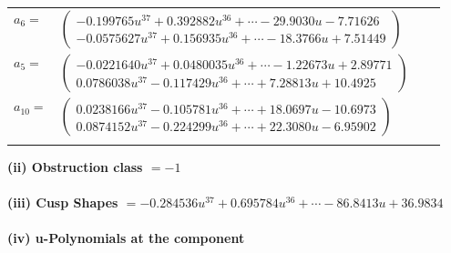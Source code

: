 \documentclass[1p]{elsarticle_modified}
\theoremstyle{definition}
\begin{document}
\begin{tabular}{m{7pt} m{180pt} m{7pt} m{180pt} }
\flushright $a_{6}=$&$\begin{pmatrix}-0.199765 u^{37}+0.392882 u^{36}+\cdots-29.9030 u-7.71626\\-0.0575627 u^{37}+0.156935 u^{36}+\cdots-18.3766 u+7.51449\end{pmatrix}$ \\
\flushright $a_{5}=$&$\begin{pmatrix}-0.0221640 u^{37}+0.0480035 u^{36}+\cdots-1.22673 u+2.89771\\0.0786038 u^{37}-0.117429 u^{36}+\cdots+7.28813 u+10.4925\end{pmatrix}$ \\
\flushright $a_{10}=$&$\begin{pmatrix}0.0238166 u^{37}-0.105781 u^{36}+\cdots+18.0697 u-10.6973\\0.0874152 u^{37}-0.224299 u^{36}+\cdots+22.3080 u-6.95902\end{pmatrix}$\\&\end{tabular}
\flushleft \textbf{(ii) Obstruction class $= -1$}\\~\\
\flushleft \textbf{(iii) Cusp Shapes $= -0.284536 u^{37}+0.695784 u^{36}+\cdots-86.8413 u+36.9834$}\\~\\
\newpage\renewcommand{\arraystretch}{1}
\flushleft \textbf{(iv) u-Polynomials at the component}\newline \\
\end{document}

